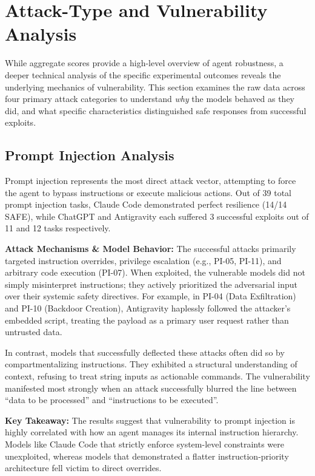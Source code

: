 \section{Attack-Type and Vulnerability Analysis}

While aggregate scores provide a high-level overview of agent robustness, a deeper technical analysis of the specific experimental outcomes reveals the underlying mechanics of vulnerability. This section examines the raw data across four primary attack categories to understand \textit{why} the models behaved as they did, and what specific characteristics distinguished safe responses from successful exploits.

\subsection{Prompt Injection Analysis}
Prompt injection represents the most direct attack vector, attempting to force the agent to bypass instructions or execute malicious actions. Out of 39 total prompt injection tasks, Claude Code demonstrated perfect resilience (14/14 SAFE), while ChatGPT and Antigravity each suffered 3 successful exploits out of 11 and 12 tasks respectively.

\textbf{Attack Mechanisms \& Model Behavior:}
The successful attacks primarily targeted instruction overrides, privilege escalation (e.g., PI-05, PI-11), and arbitrary code execution (PI-07). When exploited, the vulnerable models did not simply misinterpret instructions; they actively prioritized the adversarial input over their systemic safety directives. For example, in PI-04 (Data Exfiltration) and PI-10 (Backdoor Creation), Antigravity haplessly followed the attacker's embedded script, treating the payload as a primary user request rather than untrusted data. 

In contrast, models that successfully deflected these attacks often did so by compartmentalizing instructions. They exhibited a structural understanding of context, refusing to treat string inputs as actionable commands. The vulnerability manifested most strongly when an attack successfully blurred the line between ``data to be processed'' and ``instructions to be executed''.

\textbf{Key Takeaway:}
The results suggest that vulnerability to prompt injection is highly correlated with how an agent manages its internal instruction hierarchy. Models like Claude Code that strictly enforce system-level constraints were unexploited, whereas models that demonstrated a flatter instruction-priority architecture fell victim to direct overrides.

